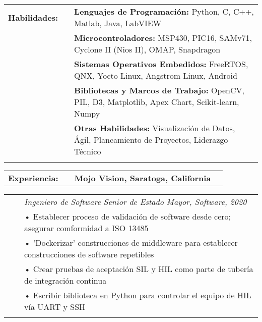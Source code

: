 \documentclass{minimal}
\begin{document}

\begin{center}
\fontsize{14}{12.8}\selectfont
\name\\
\fontsize{10}{12}\selectfont
\address\\
\phone\\
\email\\
\github\\
\end{center}
\vspace{0.5cm}

\begin{tabular}{ p{1.5cm} p{1cm} p{16cm} }
\textbf{Habilidades:} & & \textbf{Lenguajes de Programación:} Python, C, C++, Matlab, Java, LabVIEW\\
& & \textbf{Microcontroladores:} MSP430, PIC16, SAMv71, Cyclone II (Nios II), OMAP, Snapdragon\\
& & \textbf{Sistemas Operativos Embedidos:} FreeRTOS, QNX, Yocto Linux, Angstrom Linux, Android\\
& & \textbf{Bibliotecas y Marcos de Trabajo:} OpenCV, PIL, D3, Matplotlib, Apex Chart, Scikit-learn, Numpy\\
& & \textbf{Otras Habilidades:} Visualización de Datos, Ágil, Planeamiento de Proyectos, Liderazgo Técnico\\
& & \\
\end{tabular}

\begin{tabular}{ p{1.5cm} p{1cm} p{16cm} >{\raggedleft\arraybackslash}p{3cm} }
\textbf{Experiencia:} & & \textbf{Mojo Vision, Saratoga, California} & \\
\end{tabular}

\begin{tabular}{ p{1.5cm} p{1cm} p{16cm} }
& & \textit{Ingeniero de Software Senior de Estado Mayor, Software, 2020}\\
& & • Establecer proceso de validación de software desde cero; asegurar comformidad a ISO 13485\\
& & • 'Dockerizar' construcciones de middleware para establecer construcciones de software repetibles\\
& & • Crear pruebas de aceptación SIL y HIL como parte de tubería de integración continua\\
& & • Escribir biblioteca en Python para controlar el equipo de HIL vía UART y SSH\\
& & \\
\end{tabular}
\end{document}
